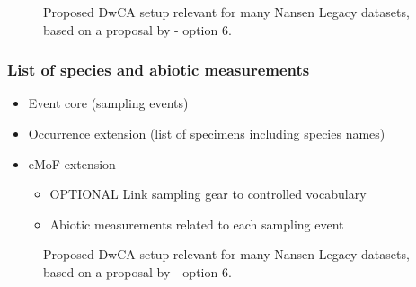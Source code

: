 \documentclass[a4paper,english, 11pt]{article}
\begin{document}
\begin{figure}[h!tb]
    \caption{\label{fig:dwca_aen_eg2}
        Proposed DwCA setup relevant for many Nansen Legacy datasets, based on a proposal by \cite{de2017toward} - option 6.
    }
\end{figure}

\subsubsection{List of species and abiotic measurements}
\label{ss:speciesmeasurementsoneoccurrence}

\begin{itemize}
\item Event core (sampling events)
\item Occurrence extension (list of specimens including species names)
\item eMoF extension
\begin{itemize}
\item OPTIONAL Link sampling gear to controlled vocabulary
\item Abiotic measurements related to each sampling event
\end{itemize}
\end{itemize}

\begin{figure}[h!tb]
    \caption{\label{fig:dwca_aen_eg3}
        Proposed DwCA setup relevant for many Nansen Legacy datasets, based on a proposal by \cite{de2017toward} - option 6.
    }
\end{figure}
\end{document}
